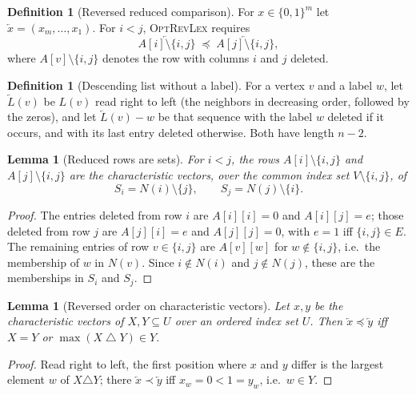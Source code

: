 \documentclass[11pt,a4paper]{article}
\newtheorem{lemma}[theorem]{Lemma}
\theoremstyle{definition}
\newtheorem{definition}[theorem]{Definition}
\theoremstyle{remark}
\newcommand{\lex}{\preceq}
\newcommand{\slex}{\prec}
\newcommand{\nb}{N}
\newcommand{\Lst}{L}
\begin{document}
\begin{definition}[Reversed reduced comparison]
For $x\in\{0,1\}^m$ let $\overleftarrow{x}=(x_m,\dots,x_1)$. For $i<j$, \textsc{OptRevLex}
requires
\[
  \overleftarrow{A[i]\setminus\{i,j\}}\;\lex\;\overleftarrow{A[j]\setminus\{i,j\}},
\]
where $A[v]\setminus\{i,j\}$ denotes the row with columns $i$ and $j$ deleted.
\end{definition}

\begin{definition}[Descending list without a label]
For a vertex $v$ and a label $w$, let $\overleftarrow{\Lst}(v)$ be $\Lst(v)$ read right to
left (the neighbors in decreasing order, followed by the zeros), and let
$\overleftarrow{\Lst}(v)-w$ be that sequence with the label $w$ deleted if it occurs, and with
its last entry deleted otherwise. Both have length $n-2$.
\end{definition}

\begin{lemma}[Reduced rows are sets]\label{lem:redsets}
For $i<j$, the rows $A[i]\setminus\{i,j\}$ and $A[j]\setminus\{i,j\}$ are the characteristic
vectors, over the common index set $V\setminus\{i,j\}$, of
\[
  S_i=\nb(i)\setminus\{j\},\qquad S_j=\nb(j)\setminus\{i\}.
\]
\end{lemma}

\begin{proof}
The entries deleted from row $i$ are $A[i][i]=0$ and $A[i][j]=e$; those deleted from row $j$
are $A[j][i]=e$ and $A[j][j]=0$, with $e=1$ iff $\{i,j\}\in E$. The remaining entries of row
$v\in\{i,j\}$ are $A[v][w]$ for $w\notin\{i,j\}$, i.e.\ the membership of $w$ in $\nb(v)$.
Since $i\notin\nb(i)$ and $j\notin\nb(j)$, these are the memberships in $S_i$ and $S_j$.
\end{proof}

\begin{lemma}[Reversed order on characteristic vectors]\label{lem:maxdiff}
Let $x,y$ be the characteristic vectors of $X,Y\subseteq U$ over an ordered index set $U$.
Then $\overleftarrow{x}\lex\overleftarrow{y}$ iff $X=Y$ or $\max(X\mathbin{\triangle}Y)\in Y$.
\end{lemma}

\begin{proof}
Read right to left, the first position where $x$ and $y$ differ is the largest element $w$
of $X\triangle Y$; there $\overleftarrow{x}\slex\overleftarrow{y}$ iff $x_w=0<1=y_w$, i.e.\
$w\in Y$.
\end{proof}
\end{document}
